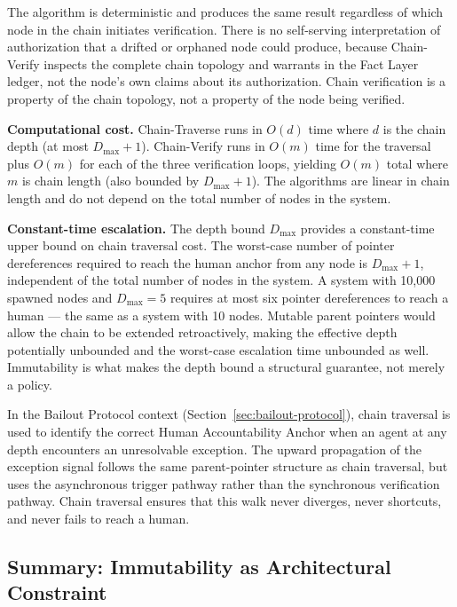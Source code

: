 The algorithm is deterministic and produces the same result regardless of which node in the chain initiates verification. There is no self-serving interpretation of authorization that a drifted or orphaned node could produce, because Chain-Verify inspects the complete chain topology and warrants in the Fact Layer ledger, not the node's own claims about its authorization. Chain verification is a property of the chain topology, not a property of the node being verified.

\bigskip
\noindent\textbf{Computational cost.} Chain-Traverse runs in $O(d)$ time where $d$ is the chain depth (at most $D_{\max} + 1$). Chain-Verify runs in $O(m)$ time for the traversal plus $O(m)$ for each of the three verification loops, yielding $O(m)$ total where $m$ is chain length (also bounded by $D_{\max} + 1$). The algorithms are linear in chain length and do not depend on the total number of nodes in the system.

\bigskip
\noindent\textbf{Constant-time escalation.} The depth bound $D_{\max}$ provides a constant-time upper bound on chain traversal cost. The worst-case number of pointer dereferences required to reach the human anchor from any node is $D_{\max} + 1$, independent of the total number of nodes in the system. A system with 10,000 spawned nodes and $D_{\max} = 5$ requires at most six pointer dereferences to reach a human --- the same as a system with 10 nodes. Mutable parent pointers would allow the chain to be extended retroactively, making the effective depth potentially unbounded and the worst-case escalation time unbounded as well. Immutability is what makes the depth bound a structural guarantee, not merely a policy.

In the Bailout Protocol context (Section~\ref{sec:bailout-protocol}), chain traversal is used to identify the correct Human Accountability Anchor when an agent at any depth encounters an unresolvable exception. The upward propagation of the exception signal follows the same parent-pointer structure as chain traversal, but uses the asynchronous trigger pathway rather than the synchronous verification pathway. Chain traversal ensures that this walk never diverges, never shortcuts, and never fails to reach a human.

\subsection{Summary: Immutability as Architectural Constraint}
\label{sec:immutability-summary}

